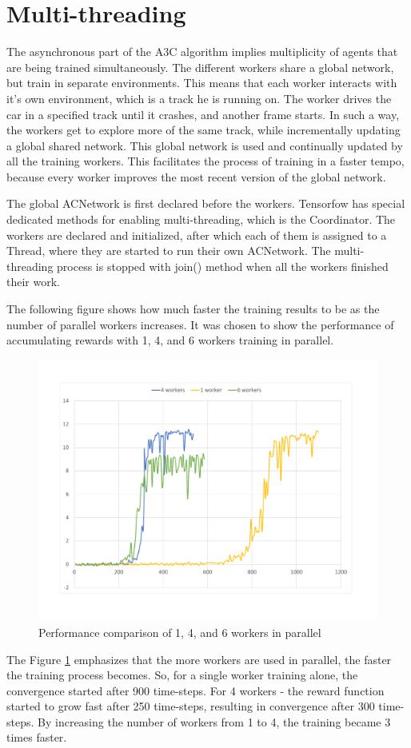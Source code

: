 \section{Multi-threading}
The asynchronous part of the A3C algorithm implies multiplicity of agents that are being trained simultaneously. The different workers share a global network, but train in separate environments. This means that each worker interacts with it's own environment, which is a track he is running on. The worker drives the car in a specified track until it crashes, and another frame starts. In such a way, the workers get to explore more of the same track, while incrementally updating a global shared network. This global network is used and continually updated by all the training workers. This facilitates the process of training in a faster tempo, because every worker improves the most recent version of the global network.

The global ACNetwork is first declared before the workers. Tensorfow has special dedicated methods for enabling multi-threading, which is the Coordinator. The workers are declared and initialized, after which each of them is assigned to a Thread, where they are started to run their own ACNetwork. The multi-threading process is stopped with join() method when all the workers finished their work.

The following figure shows how much faster the training results to be as the number of parallel workers increases. It was chosen to show the performance of accumulating rewards with 1, 4, and  6 workers training in parallel.
\begin{figure}[H]
	\centering
	\includegraphics[width=\textwidth]{Figures/Workers}
	\caption{Performance comparison of 1, 4, and 6 workers in parallel}
	\label{fig:Workers}
\end{figure}
 The Figure \ref{fig:Workers} emphasizes that the more workers are used in parallel, the faster the training process becomes. So, for a single worker training alone, the convergence started after 900 time-steps. For 4 workers - the reward function started to grow fast after 250 time-steps, resulting in convergence after 300 time-steps. By increasing the number of workers from 1 to 4, the training became 3 times faster.
 
